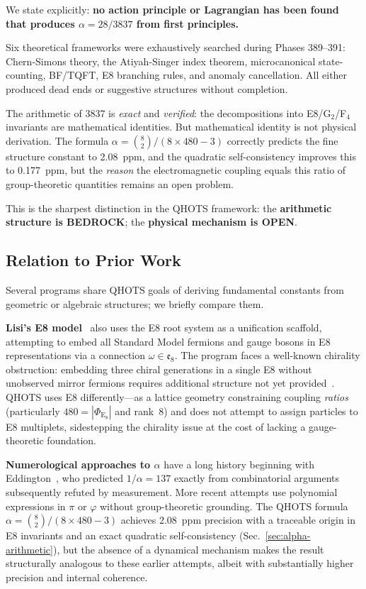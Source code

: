 \documentclass[aps,prd,twocolumn,superscriptaddress,floatfix,nofootinbib]{revtex4-2}
\theoremstyle{definition}
\theoremstyle{remark}
\newcommand{\vp}{\varphi}
\begin{document}
We state explicitly: \textbf{no action principle or Lagrangian has been found
that produces $\alpha = 28/3837$ from first principles.}

Six theoretical frameworks were exhaustively searched during Phases 389--391:
Chern-Simons theory, the Atiyah-Singer index theorem, microcanonical
state-counting, BF/TQFT, E8 branching rules, and anomaly cancellation.
All either produced dead ends or suggestive structures without completion.

The arithmetic of 3837 is \textit{exact} and \textit{verified}: the
decompositions into E8/G$_2$/F$_4$ invariants are mathematical identities.
But mathematical identity is not physical derivation. The formula
$\alpha = \binom{8}{2}/(8 \times 480 - 3)$ correctly predicts the fine
structure constant to 2.08~ppm, and the quadratic self-consistency improves
this to 0.177~ppm, but the \textit{reason} the electromagnetic coupling
equals this ratio of group-theoretic quantities remains an open problem.

This is the sharpest distinction in the QHOTS framework: the \textbf{arithmetic
structure is BEDROCK}; the \textbf{physical mechanism is OPEN}.

\subsection{Relation to Prior Work}
\label{sec:prior-work}

Several programs share QHOTS goals of deriving fundamental constants from
geometric or algebraic structures; we briefly compare them.

\textbf{Lisi's E8 model}~\cite{lisi2007} also uses the E8 root system as a
unification scaffold, attempting to embed all Standard Model fermions and gauge
bosons in E8 representations via a connection $\omega \in \mathfrak{e}_8$.
The program faces a well-known chirality obstruction: embedding three chiral
generations in a single E8 without unobserved mirror fermions requires
additional structure not yet provided~\cite{distler2010}.
QHOTS uses E8 differently---as a lattice geometry constraining coupling
\emph{ratios} (particularly $480 = |\Phi_{\mathrm{E}_8}|$ and rank~8) and does
not attempt to assign particles to E8 multiplets, sidestepping the chirality
issue at the cost of lacking a gauge-theoretic foundation.

\textbf{Numerological approaches to $\alpha$} have a long history beginning
with Eddington~\cite{eddington1929}, who predicted $1/\alpha = 137$ exactly
from combinatorial arguments subsequently refuted by measurement. More recent
attempts use polynomial expressions in $\pi$ or $\vp$ without group-theoretic
grounding. The QHOTS formula $\alpha = \binom{8}{2}/(8 \times 480 - 3)$
achieves 2.08~ppm precision with a traceable origin in E8 invariants and an
exact quadratic self-consistency (Sec.~\ref{sec:alpha-arithmetic}), but the
absence of a dynamical mechanism makes the result structurally analogous to
these earlier attempts, albeit with substantially higher precision and internal
coherence.
\end{document}
